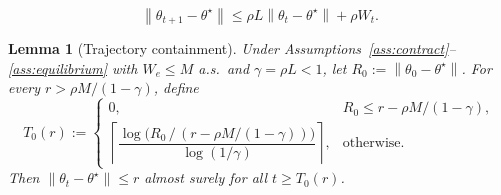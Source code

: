 \documentclass[10pt,a4paper]{amsart}
\newtheorem{lemma}{Lemma}
\newcommand{\norm}[1]{\left\lVert#1\right\rVert}
\begin{document}
\begin{equation}
\label{eq:pathwise_contract}
\norm{\theta_{t+1} - \theta^\star}
\leq \rho L \norm{\theta_t - \theta^\star} + \rho W_t.
\end{equation}

\begin{lemma}[Trajectory containment]
\label{lem:containment}
Under Assumptions~\ref{ass:contract}--\ref{ass:equilibrium} with
$W_e \leq M$ a.s.\ and $\gamma = \rho L < 1$, let
$R_0 := \norm{\theta_0 - \theta^\star}$. For every $r > \rho M/(1-\gamma)$,
define
\[
  T_0(r) :=
  \begin{cases}
    0, & R_0 \leq r - \rho M/(1-\gamma),\\[4pt]
    \left\lceil
      \dfrac{\log\bigl(R_0\,/\,(r - \rho M/(1-\gamma))\bigr)}{\log(1/\gamma)}
    \right\rceil, & \text{otherwise.}
  \end{cases}
\]
Then $\norm{\theta_t - \theta^\star} \leq r$ almost surely for all
$t \geq T_0(r)$.
\end{lemma}
\end{document}
